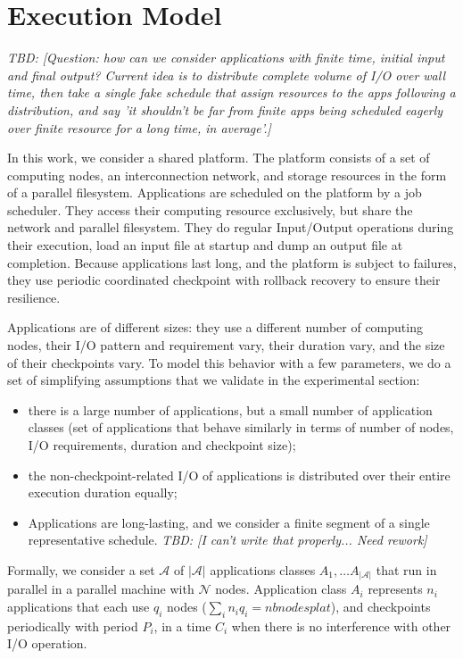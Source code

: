 \documentclass{article}
\newcommand{\appset}{{\mathcal A}}
\newcommand{\nbnodesplat}{{\mathcal N}}
\newcommand{\nbapps}{|{\mathcal A}|}
\newcommand{\app}[1]{A_{#1}}
\newcommand{\nbapp}[1]{n_{#1}}
\newcommand{\nbnodes}[1]{q_{#1}}
\newcommand{\period}[1]{P_{#1}}
\newcommand{\ckpt}[1]{C_{#1}}
\newcommand{\todo}[1]{\textit{TBD: [#1]}}
\begin{document}
\section{Execution Model}
\label{sec.model}

\todo{Question: how can we consider applications with finite time, initial
  input and final output? Current idea is to distribute complete
  volume of I/O over wall time, then take a single fake schedule that
  assign resources to the apps following a distribution, and say 'it
  shouldn't be far from finite apps being scheduled eagerly over
  finite resource for a long time, in average'.}

In this work, we consider a shared platform. The platform consists of
a set of computing nodes, an interconnection network, and storage
resources in the form of a parallel filesystem. Applications are
scheduled on the platform by a job scheduler. They access their
computing resource exclusively, but share the network and parallel
filesystem. They do regular Input/Output operations during their
execution, load an input file at startup and dump an output file at
completion. Because applications last long, and the platform is
subject to failures, they use periodic coordinated checkpoint with
rollback recovery to ensure their resilience.

Applications are of different sizes: they use a different number of
computing nodes, their I/O pattern and requirement vary, their
duration vary, and the size of their checkpoints vary. To model this
behavior with a few parameters, we do a set of simplifying assumptions
that we validate in the experimental section:
\begin{itemize}
  \item there is a large number of applications, but a small number of
    application classes (set of applications that behave similarly in
    terms of number of nodes, I/O requirements, duration and
    checkpoint size);
  \item the non-checkpoint-related I/O of applications is distributed
    over their entire execution duration equally;
  \item Applications are long-lasting, and we consider a finite
    segment of a single representative schedule.
    \todo{I can't write that properly... Need rework}
\end{itemize}

Formally, we consider a set $\appset$ of $\nbapps$ applications
classes $\app{1}, \ldots \app{\nbapps}$ that run in parallel in a
parallel machine with $\nbnodesplat$ nodes. Application class
$\app{i}$ represents $\nbapp{i}$ applications that each use
$\nbnodes{i}$ nodes
($\sum_{i}\nbapp{i} \nbnodes{i} = nbnodesplat$), and checkpoints
periodically with period $\period{i}$, in a time $\ckpt{i}$ when there
is no interference with other I/O operation.
\end{document}
